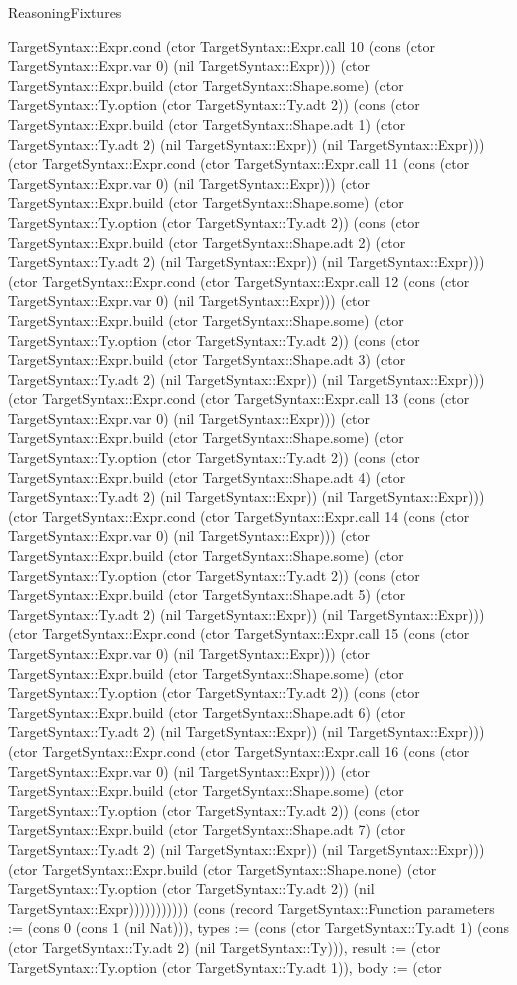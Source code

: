\begin{lexlean}{ReasoningFixtures}
\begin{semanticmodule}
{TargetSyntax::Expr.cond (ctor TargetSyntax::Expr.call 10 (cons (ctor TargetSyntax::Expr.var 0) (nil TargetSyntax::Expr))) (ctor TargetSyntax::Expr.build (ctor TargetSyntax::Shape.some) (ctor TargetSyntax::Ty.option (ctor TargetSyntax::Ty.adt 2)) (cons (ctor TargetSyntax::Expr.build (ctor TargetSyntax::Shape.adt 1) (ctor TargetSyntax::Ty.adt 2) (nil TargetSyntax::Expr)) (nil TargetSyntax::Expr))) (ctor TargetSyntax::Expr.cond (ctor TargetSyntax::Expr.call 11 (cons (ctor TargetSyntax::Expr.var 0) (nil TargetSyntax::Expr))) (ctor TargetSyntax::Expr.build (ctor TargetSyntax::Shape.some) (ctor TargetSyntax::Ty.option (ctor TargetSyntax::Ty.adt 2)) (cons (ctor TargetSyntax::Expr.build (ctor TargetSyntax::Shape.adt 2) (ctor TargetSyntax::Ty.adt 2) (nil TargetSyntax::Expr)) (nil TargetSyntax::Expr))) (ctor TargetSyntax::Expr.cond (ctor TargetSyntax::Expr.call 12 (cons (ctor TargetSyntax::Expr.var 0) (nil TargetSyntax::Expr))) (ctor TargetSyntax::Expr.build (ctor TargetSyntax::Shape.some) (ctor TargetSyntax::Ty.option (ctor TargetSyntax::Ty.adt 2)) (cons (ctor TargetSyntax::Expr.build (ctor TargetSyntax::Shape.adt 3) (ctor TargetSyntax::Ty.adt 2) (nil TargetSyntax::Expr)) (nil TargetSyntax::Expr))) (ctor TargetSyntax::Expr.cond (ctor TargetSyntax::Expr.call 13 (cons (ctor TargetSyntax::Expr.var 0) (nil TargetSyntax::Expr))) (ctor TargetSyntax::Expr.build (ctor TargetSyntax::Shape.some) (ctor TargetSyntax::Ty.option (ctor TargetSyntax::Ty.adt 2)) (cons (ctor TargetSyntax::Expr.build (ctor TargetSyntax::Shape.adt 4) (ctor TargetSyntax::Ty.adt 2) (nil TargetSyntax::Expr)) (nil TargetSyntax::Expr))) (ctor TargetSyntax::Expr.cond (ctor TargetSyntax::Expr.call 14 (cons (ctor TargetSyntax::Expr.var 0) (nil TargetSyntax::Expr))) (ctor TargetSyntax::Expr.build (ctor TargetSyntax::Shape.some) (ctor TargetSyntax::Ty.option (ctor TargetSyntax::Ty.adt 2)) (cons (ctor TargetSyntax::Expr.build (ctor TargetSyntax::Shape.adt 5) (ctor TargetSyntax::Ty.adt 2) (nil TargetSyntax::Expr)) (nil TargetSyntax::Expr))) (ctor TargetSyntax::Expr.cond (ctor TargetSyntax::Expr.call 15 (cons (ctor TargetSyntax::Expr.var 0) (nil TargetSyntax::Expr))) (ctor TargetSyntax::Expr.build (ctor TargetSyntax::Shape.some) (ctor TargetSyntax::Ty.option (ctor TargetSyntax::Ty.adt 2)) (cons (ctor TargetSyntax::Expr.build (ctor TargetSyntax::Shape.adt 6) (ctor TargetSyntax::Ty.adt 2) (nil TargetSyntax::Expr)) (nil TargetSyntax::Expr))) (ctor TargetSyntax::Expr.cond (ctor TargetSyntax::Expr.call 16 (cons (ctor TargetSyntax::Expr.var 0) (nil TargetSyntax::Expr))) (ctor TargetSyntax::Expr.build (ctor TargetSyntax::Shape.some) (ctor TargetSyntax::Ty.option (ctor TargetSyntax::Ty.adt 2)) (cons (ctor TargetSyntax::Expr.build (ctor TargetSyntax::Shape.adt 7) (ctor TargetSyntax::Ty.adt 2) (nil TargetSyntax::Expr)) (nil TargetSyntax::Expr))) (ctor TargetSyntax::Expr.build (ctor TargetSyntax::Shape.none) (ctor TargetSyntax::Ty.option (ctor TargetSyntax::Ty.adt 2)) (nil TargetSyntax::Expr))))))))))}) (cons (record TargetSyntax::Function {parameters := (cons 0 (cons 1 (nil Nat))), types := (cons (ctor TargetSyntax::Ty.adt 1) (cons (ctor TargetSyntax::Ty.adt 2) (nil TargetSyntax::Ty))), result := (ctor TargetSyntax::Ty.option (ctor TargetSyntax::Ty.adt 1)), body := (ctor }
\end{semanticmodule}
\end{lexlean}
